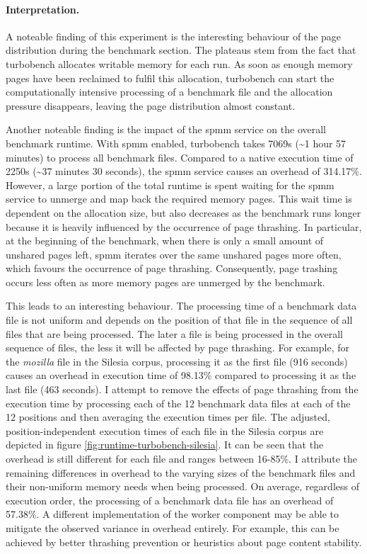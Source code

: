 \paragraph{Interpretation.}

A noteable finding of this experiment is the interesting behaviour of the page distribution during the benchmark section.
The plateaus stem from the fact that turbobench allocates writable memory for each run.
As soon as enough memory pages have been reclaimed to fulfil this allocation, turbobench can start the computationally intensive processing of a benchmark file and the allocation pressure disappears, leaving the page distribution almost constant.

Another noteable finding is the impact of the \ac{spmm} service on the overall benchmark runtime.
With \ac{spmm} enabled, turbobench takes 7069s (\textasciitilde{}1 hour 57 minutes) to process all benchmark files.
Compared to a native execution time of 2250s (\textasciitilde{}37 minutes 30 seconds), the \ac{spmm} service causes an overhead of 314.17\%.
However, a large portion of the total runtime is spent waiting for the \ac{spmm} service to unmerge and map back the required memory pages.
This wait time is dependent on the allocation size, but also decreases as the benchmark runs longer because it is heavily influenced by the occurrence of page thrashing.
In particular, at the beginning of the benchmark, when there is only a small amount of unshared pages left, \ac{spmm} iterates over the same unshared pages more often, which favours the occurrence of page thrashing.
Consequently, page trashing occurs less often as more memory pages are unmerged by the benchmark.

This leads to an interesting behaviour.
The processing time of a benchmark data file is not uniform and depends on the position of that file in the sequence of all files that are being processed.
The later a file is being processed in the overall sequence of files, the less it will be affected by page thrashing.
For example, for the \emph{mozilla} file in the Silesia corpus, processing it as the first file (916 seconds) causes an overhead in execution time of 98.13\% compared to processing it as the last file (463 seconds).
I attempt to remove the effects of page thrashing from the execution time by processing each of the 12 benchmark data files at each of the 12 positions and then averaging the execution times per file.
The adjusted, position-independent execution times of each file in the Silesia corpus are depicted in figure \ref{fig:runtime-turbobench-silesia}.
It can be seen that the overhead is still different for each file and ranges between 16-85\%.
I attribute the remaining differences in overhead to the varying sizes of the benchmark files and their non-uniform memory needs when being processed.
On average, regardless of execution order, the processing of a benchmark data file has an overhead of 57.38\%.
A different implementation of the worker component may be able to mitigate the observed variance in overhead entirely.
For example, this can be achieved by better thrashing prevention or heuristics about page content stability.

